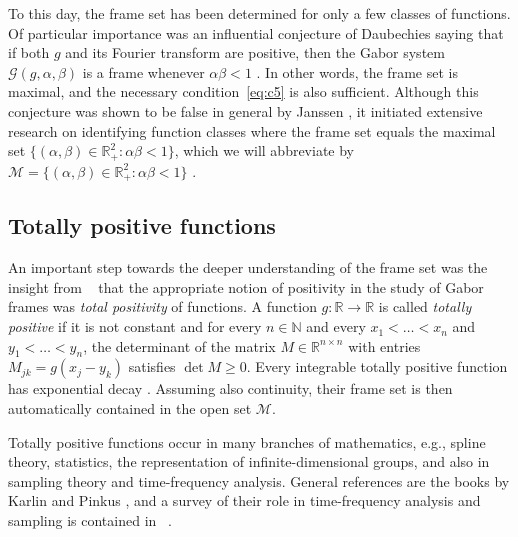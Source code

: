 \documentclass[reqno,a4paper,12pt]{amsart}
\numberwithin{equation}{section}
\def\N{{\mathbb N}}
\def\R{{\mathbb R}}
\newcommand\1{\mathds{1}}
\begin{document}
To this day, the frame set has been determined for  only a few classes
of functions. Of particular importance was 
an influential conjecture of Daubechies saying that if both $g$ and
its Fourier transform are positive, then the Gabor system
$\mathcal{G}(g,\alpha, \beta)$ is a frame whenever $\alpha\beta<1$
\cite[p.~981]{daubechies2002wavelet}. In other words,  the frame set is maximal,
and the necessary condition~\eqref{eq:c5}  is  also sufficient.  Although this
conjecture was shown to be false in general by Janssen
\cite{janssen2002some}, it initiated extensive research on identifying
function classes where the frame set  equals the maximal  set $\{
(\alpha,\beta) \in \R_{+}^2 : \alpha\beta < 1 \}$, which we will
abbreviate by $\mathcal{M} = \{
(\alpha,\beta) \in \R_{+}^2 : \alpha\beta < 1 \}$ 
\cite{belov2023gabor,Groechenig2023,grochenig2018sampling,GroechenigStoeckler2013,Janssen1996,janssen2002hyperbolic}.

\subsection{Totally positive functions}
An important step towards the deeper understanding of the frame set  was the insight from ~\cite{GroechenigStoeckler2013} that the appropriate
notion of positivity in the study of Gabor frames was \emph{total
  positivity} of  functions. A function $g:\R\to \R$ is called
\emph{totally positive} if it is not constant and for every 
$n\in \N$ and every
$x_1<\dots<x_n$ and
$y_1<\dots<y_n$, the determinant of the matrix $M \in \R^{n \times n}$
with entries $M_{jk} = g(x_j-y_k)$ satisfies $\det M \geq 0$.  Every
integrable  totally positive function  has exponential decay
\cite{Schoenberg1947}. Assuming also continuity,  their frame set is
then  automatically  contained in the open set $\mathcal{M}$.

Totally positive functions occur in many branches of mathematics,
e.g., spline theory, statistics, the representation of
infinite-dimensional groups, and also in sampling theory and
time-frequency analysis. General references are the books by Karlin
\cite{karlin1968total} and  Pinkus
\cite{pinkus2010totally}, and a survey of their role in time-frequency
analysis and sampling is contained in ~\cite{grosurvey22}. 
\end{document}
